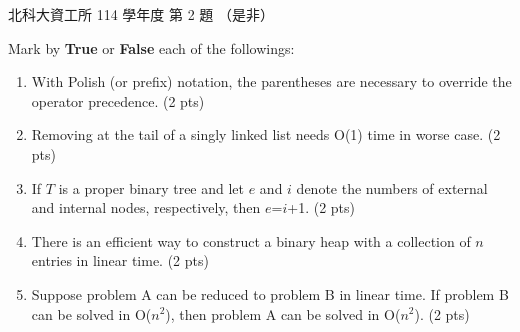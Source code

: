 \begin{pastexam}[label={px:ntut-114-ci-02}]{北科大資工所 114 學年度 第 2 題}
（是非）

Mark by \textbf{True} or \textbf{False} each of the followings:
\begin{enumerate}[label=(\arabic*)]
\item With Polish (or prefix) notation, the parentheses are necessary to override the operator precedence. (2 pts)
\item Removing at the tail of a singly linked list needs O(1) time in worse case. (2 pts)
\item If $T$ is a proper binary tree and let $e$ and $i$ denote the numbers of external and internal nodes, respectively, then $e$=$i$+1. (2 pts)
\item There is an efficient way to construct a binary heap with a collection of $n$ entries in linear time. (2 pts)
\item Suppose problem A can be reduced to problem B in linear time. If problem B can be solved in O($n^2$), then problem A can be solved in O($n^2$). (2 pts)
\end{enumerate}
\end{pastexam}

